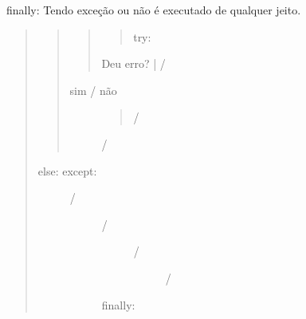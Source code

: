 \documentclass[letterpaper,10pt,brazil]{sphinxmanual}
\begin{document}
finally: Tendo exceção ou não é executado de qualquer jeito.
\begin{quote}
\begin{quote}
\begin{quote}
\begin{quote}
\begin{description}
\item[{try:}] \leavevmode
\begin{DUlineblock}{0em}
\item[] 
\end{DUlineblock}

\end{description}
\end{quote}

\begin{DUlineblock}{0em}
\item[] Deu erro? |
/ 
\end{DUlineblock}
\end{quote}
\begin{description}
\item[{sim  /   não}] \leavevmode\begin{quote}

/     
\end{quote}

/       

\end{description}
\end{quote}
\begin{description}
\item[{else:         except:}] \leavevmode\begin{description}
\item[{      /}] \leavevmode\begin{description}
\item[{    /}] \leavevmode\begin{description}
\item[{  /}] \leavevmode
/

\end{description}

\end{description}

finally:

\end{description}

\end{description}
\end{quote}
\end{document}
